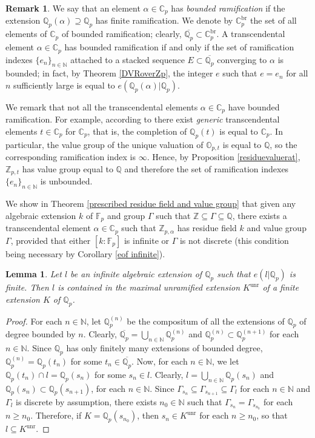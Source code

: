 \documentclass[10pt]{article}
\numberwithin{equation}{section}
\newtheorem{Lem}[equation]{Lemma}
\theoremstyle{definition}\newtheorem{Def}[equation]{Definition}
\newtheorem{Rem}[equation]{Remark}
\theoremstyle{definition}\newtheorem{Ques}[equation]{Question}
\newcommand{\F}{\mathbb{F}}
\newcommand{\Q}{\mathbb{Q}}
\newcommand{\N}{\mathbb{N}}
\newcommand{\Z}{\mathbb{Z}}
\renewcommand{\O}{\mathbb{O}}
\newcommand{\C}{\mathbb{C}}
\newcommand{\oQp}{\overline{\Q_p}}
\begin{document}
\begin{Rem}
We say that an element $\alpha\in\C_p$ has \emph{bounded ramification} if the extension $\Q_p(\alpha)\supseteq\Q_p$ has finite ramification. We denote by $\C_p^{\text{br}}$ the set of all elements of $\C_p$ of bounded ramification; clearly, $\oQp\subset\C_p^{\text{br}}$. A transcendental element $\alpha\in\C_p$ has bounded ramification if and only if the set of ramification indexes $\{e_n\}_{n\in\N}$ attached to a stacked  sequence $E\subset\oQp$ converging to $\alpha$ is bounded; in fact, by Theorem   \ref{DVRoverZp}, the integer $e$ such that $e=e_n$ for all $n$ sufficiently large is equal to $e(\Q_p(\alpha)|\Q_p)$.  

We remark that not all the transcendental elements $\alpha\in\C_p$ have bounded ramification. For example, according  to \cite{IovZah} there exist \emph{generic} transcendental elements $t\in\C_p$ for $\C_p$, that is, the completion of $\Q_p(t)$ is equal to $\C_p$. In particular, the value group of the unique valuation of $\O_{p,t}$ is equal to $\Q$, so the corresponding ramification index is $\infty$. Hence, by Proposition \ref{residuevaluerat}, $\Z_{p,t}$ has  value group equal to $\Q$  and therefore the  set of ramification indexes $\{e_n\}_{n\in\N}$ is unbounded. 

We show in Theorem \ref{prescribed residue field and value group} that given any algebraic extension $k$ of $\F_p$ and group $\Gamma$ such that $\Z\subseteq\Gamma\subseteq\Q$, there exists a transcendental element $\alpha\in\C_p$ such that $\Z_{p,\alpha}$ has residue field $k$ and value group $\Gamma$, provided that either $[k:\F_p]$ is infinite or $\Gamma$ is not discrete (this condition being necessary by Corollary  \ref{eof infinite}).
\end{Rem}

\begin{Lem}\label{maxunr}
Let $l$ be an infinite algebraic extension of $\Q_p$ such that $e(l|\Q_p)$ is finite. Then $l$ is contained in the maximal unramified extension $K^{\text{unr}}$ of a finite extension $K$ of $\Q_p$.
\end{Lem}
\begin{proof}
For each $n\in\N$, let $\Q_p^{(n)}$ be the compositum of all the extensions of $\Q_p$ of degree bounded by $n$. Clearly, $\oQp=\bigcup_{n\in\N}\Q_p^{(n)}$ and $\Q_p^{(n)}\subset \Q_p^{(n+1)}$ for each $n\in\N$. Since $\Q_p$ has only finitely many extensions of bounded degree, $\Q_p^{(n)}=\Q_p(t_n)$ for some $t_n\in\oQp$. Now, for each $n\in\N$, we let $\Q_p(t_n)\cap l=\Q_p(s_n)$ for some $s_n\in l$. Clearly, $l=\bigcup_{n\in\N}\Q_p(s_n)$ and $\Q_p(s_n)\subset \Q_p(s_{n+1})$, for each $n\in\N$. Since $\Gamma_{s_n}\subseteq\Gamma_{s_{n+1}}\subseteq\Gamma_l$ for each $n\in\N$ and $\Gamma_l$ is discrete by assumption, there exists $n_0\in\N$ such that $\Gamma_{s_n}=\Gamma_{s_{n_0}}$ for each $n\geq n_0$. Therefore, if $K=\Q_p(s_{n_0})$, then $s_n\in K^{\text{unr}}$ for each $n\geq n_0$, so that $l\subseteq K^{\text{unr}}$.
\end{proof}
\end{document}

